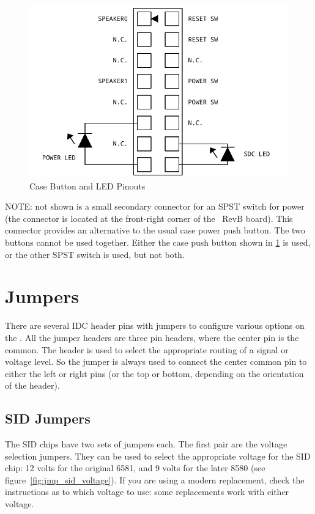 \begin{figure}[ht]
    \begin{center}
        \includegraphics[scale=0.65]{images/f256_port_case.pdf}
    \end{center}
    \caption{Case Button and LED Pinouts}
    \label{fig:port_case}
\end{figure}

NOTE: not shown is a small secondary connector for an SPST switch for power (the connector is located at the front-right corner of the \jr\ RevB board). This connector provides an alternative to the usual case power push button. The two buttons cannot be used together. Either the case push button shown in \ref{fig:port_case} is used, or the other SPST switch is used, but not both.

\section*{Jumpers}

There are several IDC header pins with jumpers to configure various options on the \jr. All the jumper headers are three pin headers, where the center pin is the common. The header is used to select the appropriate routing of a signal or voltage level. So the jumper is always used to connect the center common pin to either the left or right pins (or the top or bottom, depending on the orientation of the header).

\subsection*{SID Jumpers}

The SID chips have two sets of jumpers each. The first pair are the voltage selection jumpers. They can be used to select the appropriate voltage for the SID chip: 12 volts for the original 6581, and 9 volts for the later 8580 (see figure~\ref{fig:jmp_sid_voltage}). If you are using a modern replacement, check the instructions as to which voltage to use: some replacements work with either voltage.

